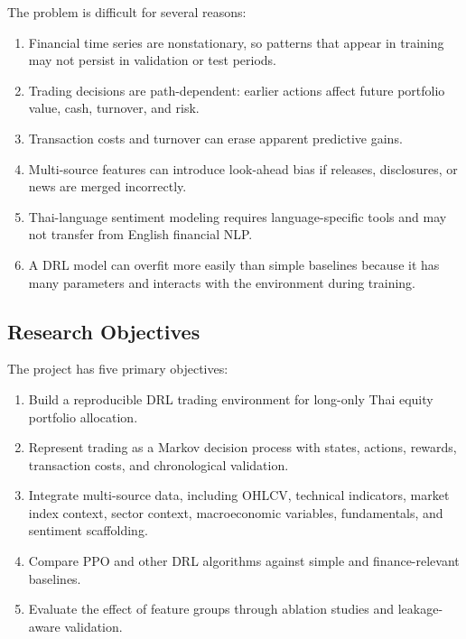 \documentclass[11pt]{article}
\begin{document}
The problem is difficult for several reasons:
\begin{enumerate}
    \item Financial time series are nonstationary, so patterns that appear in training may not persist in validation or test periods.
    \item Trading decisions are path-dependent: earlier actions affect future portfolio value, cash, turnover, and risk.
    \item Transaction costs and turnover can erase apparent predictive gains.
    \item Multi-source features can introduce look-ahead bias if releases, disclosures, or news are merged incorrectly.
    \item Thai-language sentiment modeling requires language-specific tools and may not transfer from English financial NLP.
    \item A DRL model can overfit more easily than simple baselines because it has many parameters and interacts with the environment during training.
\end{enumerate}

\subsection{Research Objectives}
The project has five primary objectives:
\begin{enumerate}
    \item Build a reproducible DRL trading environment for long-only Thai equity portfolio allocation.
    \item Represent trading as a Markov decision process with states, actions, rewards, transaction costs, and chronological validation.
    \item Integrate multi-source data, including OHLCV, technical indicators, market index context, sector context, macroeconomic variables, fundamentals, and sentiment scaffolding.
    \item Compare PPO and other DRL algorithms against simple and finance-relevant baselines.
    \item Evaluate the effect of feature groups through ablation studies and leakage-aware validation.
\end{enumerate}
\end{document}

